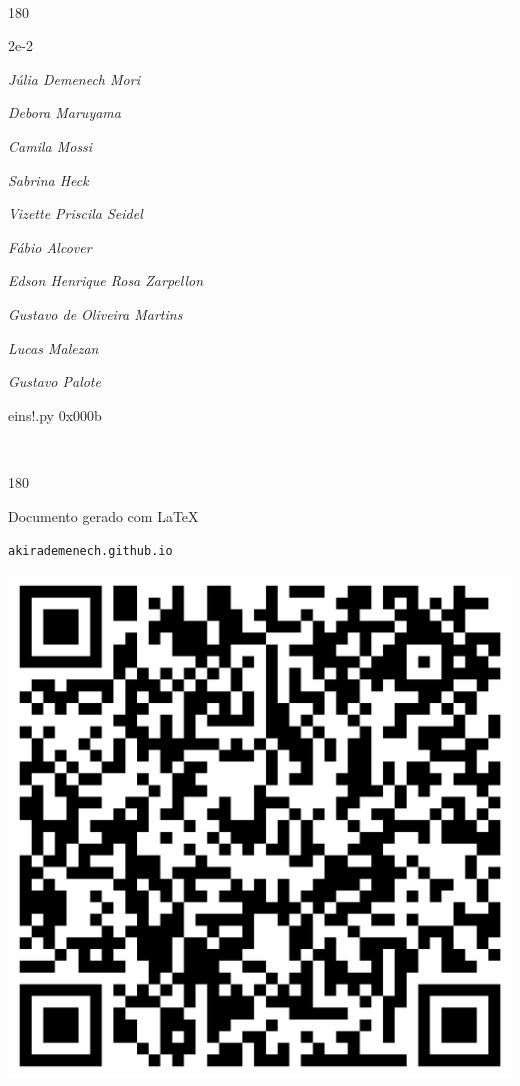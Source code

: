 \documentclass[12pt]{article}
\begin{document}
	\ 
	\vfill
	\begin{turn}{180}	
		\begin{minipage}{\textwidth}
		  	\ttfamily %
			\centering
			{\Huge 2e-2}
		  
			\hfill
		  
			

\textit{\small Júlia Demenech Mori}

\textit{\small Debora Maruyama}

\textit{\small Camila Mossi}

\textit{\small Sabrina Heck}

\textit{\small Vizette Priscila Seidel}

\textit{\small Fábio Alcover}

\textit{\small Edson Henrique Rosa Zarpellon}

\textit{\small Gustavo de Oliveira Martins}

\textit{\small Lucas Malezan}

\textit{\small Gustavo Palote}

\bigskip

eins!.py
0x000b


		\end{minipage}	
	\end{turn}
	\vfill
	\

\pagebreak

	\begin{turn}{180}	
		\begin{minipage}{\textwidth}		  
		  Documento gerado com \LaTeX			
		  
		  \texttt{akirademenech.github.io}

		  \includegraphics[height=0.3\textheight]{2e-2.pdf}

		\end{minipage}	
	\end{turn}  
		  
\end{document}
